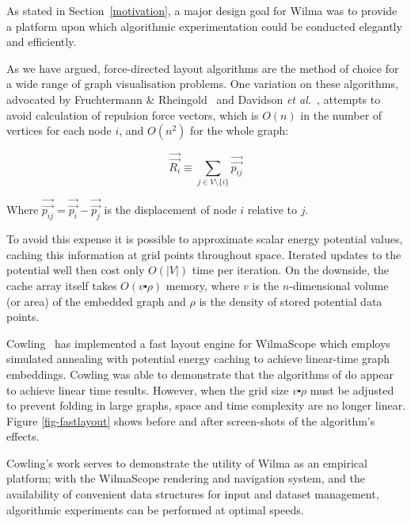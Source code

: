 \documentclass[runningheads]{cl2emult}
\newcommand{\avec}[1]{\vec{\overrightarrow{ #1}}}
\begin{document}
As stated in Section~\ref{motivation}, a major design goal for Wilma
was to provide a platform upon which algorithmic experimentation could be
conducted elegantly and efficiently.

As we have argued, force-directed layout algorithms are the method of
choice for a wide range of graph visualisation problems.  One
variation on these algorithms, advocated by Fruchtermann \&
Rheingold~\cite{fruchtermann90force-directed} and Davidson {\em et
al.}~\cite{davidson01noise}, attempts to avoid calculation of
repulsion force vectors, which is $O(n)$ in the number of vertices for
each node $i$, and $O(n^2)$ for the whole graph:

\begin{equation}
\label{repulsion}
\avec{R_i} \equiv \sum_{j \in V \setminus \{i\}} \avec{p_{ij}}
\end{equation}

\noindent Where $\avec{p_{ij}} = \avec{p_i} - \avec{p_j}$ is the displacement
of node $i$ relative to $j$.

To avoid this expense it is possible to approximate scalar energy potential
values, caching this information at grid points throughout space.  Iterated
updates to the potential well then cost only $O(|V|)$ time per iteration.  On
the downside, the cache array itself takes $O(v \centerdot \rho)$ memory,
where $v$ is the $n$-dimensional volume (or area) of the embedded graph and
$\rho$ is the density of stored potential data points.

Cowling~\cite{cowling02fast} has implemented a fast layout engine for
WilmaScope which employs simulated annealing with potential energy caching to
achieve linear-time graph embeddings.  Cowling was able to demonstrate that
the algorithms of \cite{davidson01noise} do appear to achieve linear time
results.  However, when the grid size $v \centerdot \rho$ must be adjusted to
prevent folding in large graphs, space and time complexity are no longer
linear.  Figure \ref{fig-fastlayout} shows before and after screen-shots of
the algorithm's effects.

Cowling's work serves to demonstrate the utility of Wilma as an empirical
platform; with the WilmaScope rendering and navigation system, and the
availability of convenient data structures for input and dataset management,
algorithmic experiments can be performed at optimal speeds.
\end{document}
